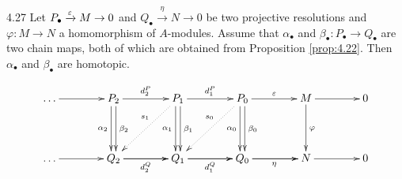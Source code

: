 \documentclass[twoside = false,	%
		headsepline,		%
		parskip = true,
		]{scrbook}						%
\begin{document}
    \begin{proposition}{}{4.27}
        Let $P_\bullet \xrightarrow{\varepsilon} M \to 0$ and $Q_\bullet \xrightarrow{\eta} N \to 0$ be two projective resolutions and $\varphi: M \to N$ a homomorphism of $A$-modules. Assume that $\alpha_\bullet$ and $\beta_\bullet: P_\bullet \to Q_\bullet$ are two chain maps, both of which are obtained from Proposition \ref{prop:4.22}. Then $\alpha_\bullet$ and $\beta_\bullet$ are homotopic.
    \end{proposition}

    \begin{equation*}
    \xymatrix@C=40pt @R=40pt{
        \dots \ar[r] & P_{2} \ar[r]^{d_{2}^P} \ar@<-0.5ex>[d]_{\alpha_{2}} \ar@<0.5ex>[d]^{\beta_{2}} & P_{1} \ar[r]^{d_{1}^P} \ar@<-0.5ex>[d]_{\alpha_{1}} \ar@<0.5ex>[d]^{\beta_{1}} \ar@{.>}[dl]_(.4){s_{1}} & P_0 \ar[r]^{\e} \ar@<-0.5ex>[d]_{\alpha_{0}} \ar@<0.5ex>[d]^{\beta_{0}} \ar@{.>}[dl]_(.4){s_{0}} & M \ar[r] \ar[d]^{\varphi} & 0\\
        \dots \ar[r] & Q_{2} \ar[r]\ar[r]_{d_{2}^Q} & Q_1 \ar[r]\ar[r]_{d_{1}^Q} & Q_0 \ar[r]\ar[r]_{\eta} & N \ar[r] & 0
    }
    \end{equation*}
\end{document}
